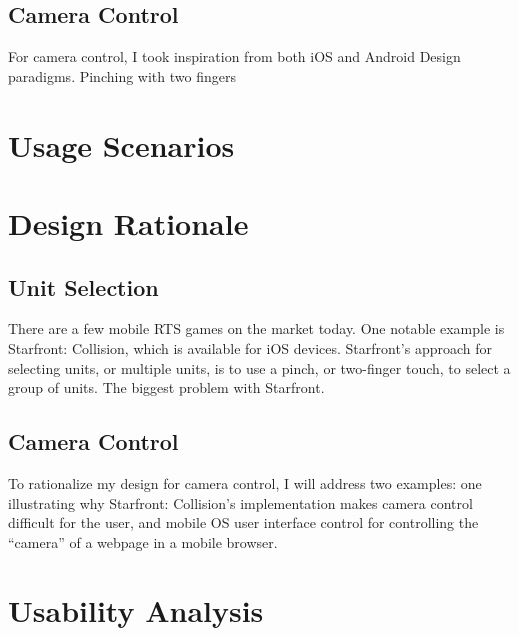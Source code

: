 \documentclass[11pt]{article}
\begin{document}
	\subsection{Camera Control}
	For camera control, I took inspiration from both iOS and Android Design paradigms. Pinching with two fingers
\section{Usage Scenarios}
\section{Design Rationale}
	\subsection{Unit Selection}
	There are a few mobile RTS games on the market today. One notable example is Starfront: Collision, which is available for iOS devices. Starfront's approach for selecting units, or multiple units, is to use a pinch, or two-finger touch, to select a group of units. The biggest problem with Starfront.
	\subsection{Camera Control}
	To rationalize my design for camera control, I will address two examples: one illustrating why Starfront: Collision's implementation makes camera control difficult for the user, and mobile OS user interface control for controlling the ``camera'' of a webpage in a mobile browser.
\section{Usability Analysis}
\end{document}
